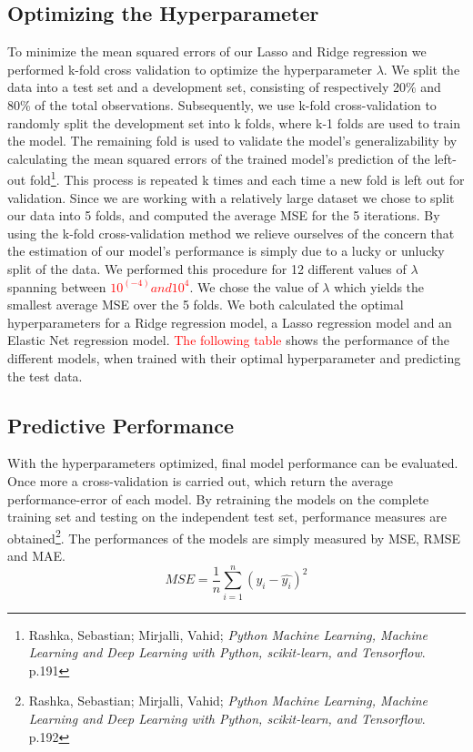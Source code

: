 \documentclass[12pt,a4paper]{article}
\begin{document}
\subsection{Optimizing the Hyperparameter}
To minimize the mean squared errors of our Lasso and Ridge regression we performed k-fold cross validation to optimize the hyperparameter $\lambda$. 
We split the data into a test set and a development set, consisting of respectively 20\% and 80\% of the total observations. Subsequently, we use k-fold cross-validation to randomly split the development set into k folds, where k-1 folds are used to train the model. The remaining fold is used to validate the model’s generalizability by calculating the mean squared errors of the trained model’s prediction of the left-out fold\footnote{Rashka, Sebastian; Mirjalli, Vahid; \textit{Python Machine Learning, Machine Learning and Deep Learning with Python, scikit-learn, and Tensorflow}. p.191}. This process is repeated k times and each time a new fold is left out for validation. Since we are working with a relatively large dataset we chose to split our data into 5 folds, and computed the average MSE for the 5 iterations. By using the k-fold cross-validation method we relieve ourselves of the concern that the estimation of our model’s performance is simply due to a lucky or unlucky split of the data. \newline
We performed this procedure for 12 different values of $\lambda$ spanning between \textcolor{red}{$10^(-4) and 10^4$}. We chose the value of $\lambda$ which yields the smallest average MSE over the 5 folds. 
We both calculated the optimal hyperparameters for a Ridge regression model, a Lasso regression model and an Elastic Net regression model. \textcolor{red}{The following table} shows the performance of the different models, when trained with their optimal hyperparameter and predicting the test data.

\subsection{Predictive Performance}
With the hyperparameters optimized, final model performance can be evaluated. Once more a cross-validation is carried out, which return the average performance-error of each model. By retraining the models on the complete training set and testing on the independent test set, performance measures are obtained\footnote{Rashka, Sebastian; Mirjalli, Vahid; \textit{Python Machine Learning, Machine Learning and Deep Learning with Python, scikit-learn, and Tensorflow}. p.192}. \newline The performances of the models are simply measured by MSE, RMSE and MAE. \newline
$$ MSE = \frac{1}{n}\sum_{i=1}^{n}(y_i-\hat{y_i})^2$$
\end{document}
